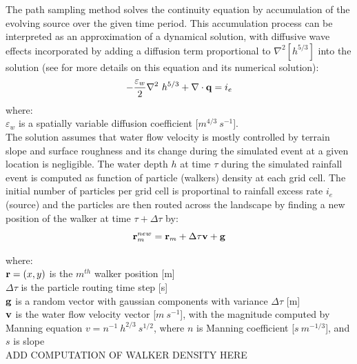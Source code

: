 \documentclass[gmd, manuscript]{copernicus}
\begin{document}
The path sampling method solves the continuity equation by accumulation of the evolving source
over the given time period. This accumulation process can be interpreted as
an approximation of a dynamical solution,
with diffusive wave effects incorporated by adding a diffusion term proportional to
$ \nabla^2 [h^{5/3}]$
into the solution (see \cite{Mitasova2004} for more details on this equation and its numerical solution):
\begin{equation}
\label{eq:difwater}
-{\varepsilon_w\over 2 }\nabla^2 ~ h^{5/3}
+\nabla \cdot {\bf q} = i_e
\end{equation}
{\small
\noindent
 where: \\
 \noindent
 \hspace*{0.5em} $\varepsilon_w$ is a spatially variable diffusion coefficient [$\unit{m}^{4/3}~\unit{s}^{-1}$]. \\
}
The solution assumes that water flow velocity is mostly controlled by terrain slope and surface roughness 
and its change during the simulated event at a given location is negligible. 
The water depth $h$ at time $\tau$ during the simulated rainfall event
 is computed as function of particle (walkers) density at each grid cell. 
The initial number of particles per grid cell is proportinal to rainfall excess rate $i_e$ (source)
and the particles are then routed across the landscape by finding a new position of the walker at time $\tau + \Delta \tau$ by:
\begin{equation}
{\bf r}_m^{new}={\bf r}_m + \Delta \tau {\bf v} + {\bf g}
\end{equation}

{\small
\noindent
where: \\
\noindent
\hspace*{0.5em} ${\bf r} = (x, y)$ is the $m^{th}$ walker position [\unit{m}]\\
\hspace*{0.5em} $\Delta \tau$ is the particle routing time step [\unit{s}]\\
\hspace*{0.5em} ${\bf g}$ is a random vector with gaussian components with variance $\Delta \tau$ [\unit{m}]\\
\hspace*{0.5em} ${\bf v} $ is the water flow velocity vector [$\unit{m~s^{-1}}$],  
with the magnitude computed by Manning equation $v=n^{-1}~h^{2/3}~s^{1/2}$, 
where $n$ is Manning coefficient [$\unit{s~m^{-1/3}}$], and $s$ is slope\\ 
}
ADD COMPUTATION OF WALKER DENSITY HERE 
\end{document}
